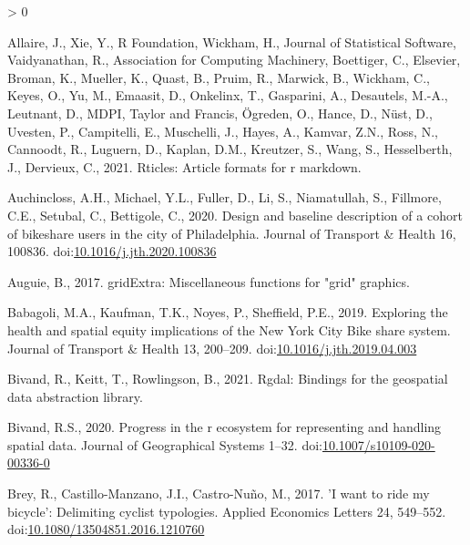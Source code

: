 \documentclass[]{elsarticle} %
\newlength{\cslhangindent}
\newenvironment{CSLReferences}[2] %
 {%
  \setlength{\parindent}{0pt}
  \ifodd #1 \everypar{\setlength{\hangindent}{\cslhangindent}}\ignorespaces\fi
  \ifnum #2 > 0
  \setlength{\parskip}{#2\baselineskip}
  \fi
 }%
 {}
\begin{document}
\hypertarget{refs}{}
\begin{CSLReferences}{1}{0}
\leavevmode\hypertarget{ref-R-rticles}{}%
Allaire, J., Xie, Y., R Foundation, Wickham, H., Journal of Statistical
Software, Vaidyanathan, R., Association for Computing Machinery,
Boettiger, C., Elsevier, Broman, K., Mueller, K., Quast, B., Pruim, R.,
Marwick, B., Wickham, C., Keyes, O., Yu, M., Emaasit, D., Onkelinx, T.,
Gasparini, A., Desautels, M.-A., Leutnant, D., MDPI, Taylor and Francis,
Ögreden, O., Hance, D., Nüst, D., Uvesten, P., Campitelli, E.,
Muschelli, J., Hayes, A., Kamvar, Z.N., Ross, N., Cannoodt, R., Luguern,
D., Kaplan, D.M., Kreutzer, S., Wang, S., Hesselberth, J., Dervieux, C.,
2021. Rticles: Article formats for r markdown.

\leavevmode\hypertarget{ref-auchinclossDesignBaselineDescription2020}{}%
Auchincloss, A.H., Michael, Y.L., Fuller, D., Li, S., Niamatullah, S.,
Fillmore, C.E., Setubal, C., Bettigole, C., 2020. Design and baseline
description of a cohort of bikeshare users in the city of
{Philadelphia}. Journal of Transport \& Health 16, 100836.
doi:\href{https://doi.org/10.1016/j.jth.2020.100836}{10.1016/j.jth.2020.100836}

\leavevmode\hypertarget{ref-R-gridExtra}{}%
Auguie, B., 2017. gridExtra: Miscellaneous functions for "grid"
graphics.

\leavevmode\hypertarget{ref-babagoliExploringHealthSpatial2019}{}%
Babagoli, M.A., Kaufman, T.K., Noyes, P., Sheffield, P.E., 2019.
Exploring the health and spatial equity implications of the {New York
City Bike} share system. Journal of Transport \& Health 13, 200--209.
doi:\href{https://doi.org/10.1016/j.jth.2019.04.003}{10.1016/j.jth.2019.04.003}

\leavevmode\hypertarget{ref-R-rgdal}{}%
Bivand, R., Keitt, T., Rowlingson, B., 2021. Rgdal: Bindings for the
geospatial data abstraction library.

\leavevmode\hypertarget{ref-bivand2020progress}{}%
Bivand, R.S., 2020. Progress in the r ecosystem for representing and
handling spatial data. Journal of Geographical Systems 1--32.
doi:\href{https://doi.org/10.1007/s10109-020-00336-0}{10.1007/s10109-020-00336-0}

\leavevmode\hypertarget{ref-breyWantRideMy2017}{}%
Brey, R., Castillo-Manzano, J.I., Castro-Nuño, M., 2017. 'I want to ride
my bicycle': Delimiting cyclist typologies. Applied Economics Letters
24, 549--552.
doi:\href{https://doi.org/10.1080/13504851.2016.1210760}{10.1080/13504851.2016.1210760}


\end{CSLReferences}
\end{document}
